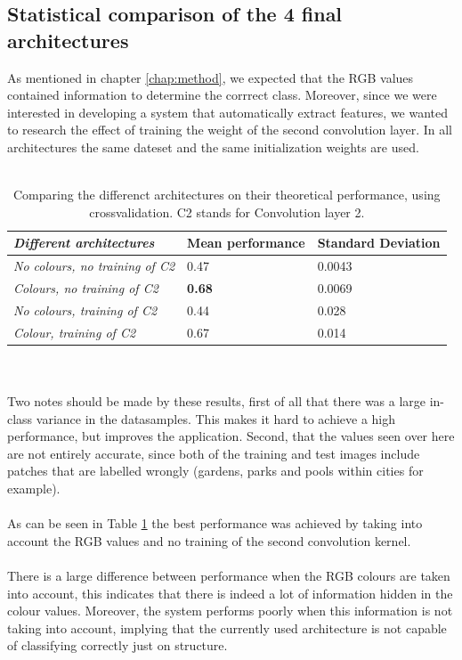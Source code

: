 \documentclass[a4paper,onecolumn]{report}
\begin{document}
\subsection{Statistical comparison of the 4 final architectures}
As mentioned in chapter \ref{chap:method}, we expected that the RGB values contained information to determine the corrrect class. Moreover, since we were interested in developing a system that automatically extract features, we wanted to research the effect of training the weight of the second convolution layer. In all architectures the same dateset and the same initialization weights are used.
\\\\
\begin{table}[h!]
\begin{tabular}{ | l | l | l | }
\hline
	\textbf{\textit{Different architectures}} & \textbf{Mean performance} &\textbf{Standard Deviation}   \\ \hline
	\textit{No colours, no training of C2 }& 0.47 & 0.0043 \\ \hline
	\textit{Colours, no training of C2} & \textbf{0.68}& 0.0069 \\ \hline
	\textit{No colours, training of C2} & 0.44 & 0.028 \\ \hline
	\textit{Colour, training of C2} & 0.67 & 0.014 \\ \hline
\end{tabular}
\caption{Comparing the differenct architectures on their theoretical performance, using crossvalidation. C2 stands for Convolution layer 2.}
\label{tab:crossvalidation results}
\end{table}
\\\\
Two notes should be made by these results, first of all that there was a large in-class variance in the datasamples. This makes it hard to achieve a high performance, but improves the application. Second, that the values seen over here are not entirely accurate, since both of the training and test images include patches that are labelled wrongly (gardens, parks and pools within cities for example).
\\\\
As can be seen in Table \ref{tab:crossvalidation results} the best performance was achieved by taking into account the RGB values and no training of the second convolution kernel.
\\\\
There is a large difference between performance when the RGB colours are taken into account, this indicates that there is indeed a lot of information hidden in the colour values. Moreover, the system performs poorly when this information is not taking into account, implying that the currently used architecture is not capable of classifying correctly just on structure.
\end{document}
